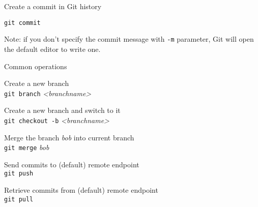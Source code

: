 \begin{frame}[fragile]{Create a commit in Git history}

\vspace{2em}

\Large \texttt{git commit}

\vspace{2em}

Note: if you don't specify the commit message with \texttt{-m} parameter,
Git will open the default editor to write one.

\end{frame}


\begin{frame}[fragile]{Common operations}

Create a new branch \\
\texttt{git branch} \textit{<branchname>}

Create a new branch and switch to it \\
\texttt{git checkout -b} \textit{<branchname>}

Merge the branch \textit{bob} into current branch \\
\texttt{git merge} \textit{bob}

Send commits to (default) remote endpoint \\
\texttt{git push}

Retrieve commits from (default) remote endpoint \\
\texttt{git pull}

\end{frame}
